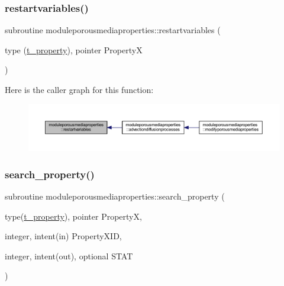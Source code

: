 \subsubsection{\texorpdfstring{restartvariables()}{restartvariables()}}
{\footnotesize\ttfamily subroutine moduleporousmediaproperties\+::restartvariables (\begin{DoxyParamCaption}\item[{type (\mbox{\hyperlink{structmoduleporousmediaproperties_1_1t__property}{t\+\_\+property}}), pointer}]{PropertyX }\end{DoxyParamCaption})\hspace{0.3cm}{\ttfamily [private]}}

Here is the caller graph for this function\+:\nopagebreak
\begin{figure}[H]
\begin{center}
\leavevmode
\includegraphics[width=350pt]{namespacemoduleporousmediaproperties_afc91dc82442179a1d26d776a3a1007d6_icgraph}
\end{center}
\end{figure}
\mbox{\label{namespacemoduleporousmediaproperties_af477cac3aa38958d32a9af0ae317241f}} 
\subsubsection{\texorpdfstring{search\+\_\+property()}{search\_property()}}
{\footnotesize\ttfamily subroutine moduleporousmediaproperties\+::search\+\_\+property (\begin{DoxyParamCaption}\item[{type(\mbox{\hyperlink{structmoduleporousmediaproperties_1_1t__property}{t\+\_\+property}}), pointer}]{PropertyX,  }\item[{integer, intent(in)}]{Property\+X\+ID,  }\item[{integer, intent(out), optional}]{S\+T\+AT }\end{DoxyParamCaption})\hspace{0.3cm}{\ttfamily [private]}}

